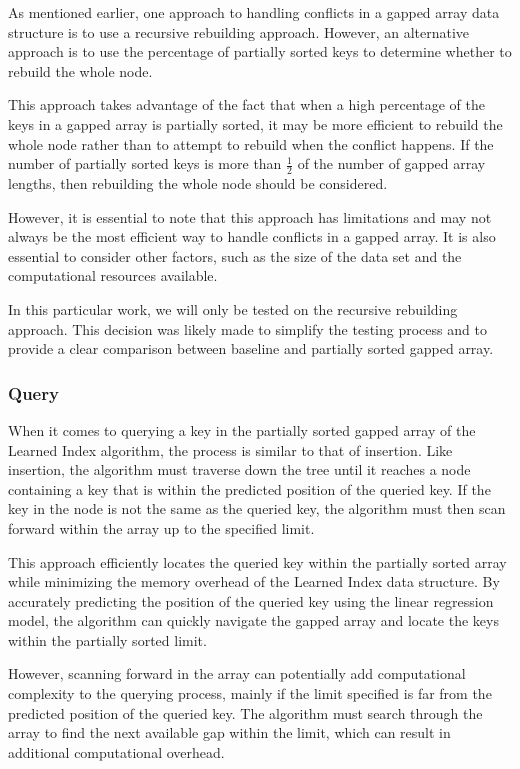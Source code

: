 \documentclass[11pt,a4paper]{article}
\newcommand{\learnindex}{\textsf{Learned Index}\xspace}
\newcommand{\conflict}{\textsf{conflict}\xspace}
\begin{document}
As mentioned earlier, one approach to handling conflicts in a gapped array data structure is to use a recursive rebuilding approach. However, an alternative approach is to use the percentage of partially sorted keys to determine whether to rebuild the whole node.

This approach takes advantage of the fact that when a high percentage of the keys in a gapped array is partially sorted, it may be more efficient to rebuild the whole node rather than to attempt to rebuild when the \conflict happens. If the number of partially sorted keys is more than $\frac{1}{2}$ of the number of gapped array lengths, then rebuilding the whole node should be considered.

However, it is essential to note that this approach has limitations and may not always be the most efficient way to handle conflicts in a gapped array. It is also essential to consider other factors, such as the size of the data set and the computational resources available.

In this particular work, we will only be tested on the recursive rebuilding approach. This decision was likely made to simplify the testing process and to provide a clear comparison between baseline and partially sorted gapped array. 


\subsubsection{Query}
When it comes to querying a key in the partially sorted gapped array of the \learnindex algorithm, the process is similar to that of insertion. Like insertion, the algorithm must traverse down the tree until it reaches a node containing a key that is within the predicted position of the queried key. If the key in the node is not the same as the queried key, the algorithm must then scan forward within the array up to the specified limit.

This approach efficiently locates the queried key within the partially sorted array while minimizing the memory overhead of the \learnindex data structure. By accurately predicting the position of the queried key using the linear regression model, the algorithm can quickly navigate the gapped array and locate the keys within the partially sorted limit.

However, scanning forward in the array can potentially add computational complexity to the querying process, mainly if the limit specified is far from the predicted position of the queried key. The algorithm must search through the array to find the next available gap within the limit, which can result in additional computational overhead. 
\end{document}
